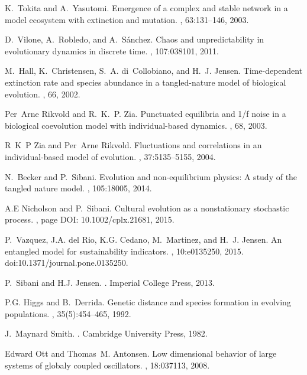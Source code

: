 \documentclass[12pt]{article}
\begin{document}
\begin{thebibliography}{99}
K.~Tokita and A.~Yasutomi.
\newblock Emergence of a complex and stable network in a model ecosystem with
  extinction and mutation.
, 63:131--146, 2003.

D.~Vilone, A.~Robledo, and A.~S{\' a}nchez.
\newblock Chaos and unpredictability in evolutionary dynamics in discrete time.
, 107:038101, 2011.

M.~Hall, K.~Christensen, S.~A. di~Collobiano, and H.~J. Jensen.
\newblock Time-dependent extinction rate and species abundance in a
  tangled-nature model of biological evolution.
, 66, 2002.

Per~Arne Rikvold and R.~K.~P. Zia.
\newblock Punctuated equilibria and 1/f noise in a biological coevolution model
  with individual-based dynamics.
, 68, 2003.

R~K~P Zia and Per~Arne Rikvold.
\newblock Fluctuations and correlations in an individual-based model of
  evolution.
, 37:5135--5155, 2004.

N.~Becker and P.~Sibani.
\newblock Evolution and non-equilibrium physics: A study of the tangled nature
  model.
, 105:18005, 2014.

A.E Nicholson and P.~Sibani.
\newblock Cultural evolution as a nonstationary stochastic process.
, page DOI: 10.1002/cplx.21681, 2015.

P.~Vazquez, J.A. del Rio, K.G. Cedano, M.~Martinez, and H.~J. Jensen.
\newblock An entangled model for sustainability indicators.
, 10:e0135250, 2015.
\newblock doi:10.1371/journal.pone.0135250.

P.~Sibani and H.J. Jensen.
.
\newblock Imperial College Press, 2013.

P.G. Higgs and B.~Derrida.
\newblock Genetic distance and species formation in evolving populations.
, 35(5):454--465, 1992.

J.~Maynard Smith.
.
\newblock Cambridge University Press, 1982.

Edward Ott and Thomas~M. Antonsen.
\newblock Low dimensional behavior of large systems of globaly coupled
  oscillators.
, 18:037113, 2008.


\end{thebibliography}
\end{document}
